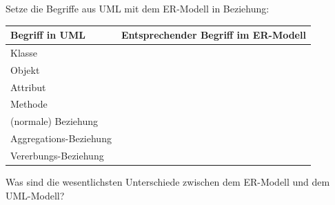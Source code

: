 \begin{compactenum}[a)]
\item Setze die Begriffe aus UML mit dem ER-Modell in Beziehung:

\vspace{2mm}

\bgroup
\def\arraystretch{1.2}
\begin{tabular}{|l|l|}\hline
\textbf{Begriff in UML} & \textbf{Entsprechender Begriff im ER-Modell\hspace{2cm}}
\\
\hline Klasse & \\ \hline
Objekt & \\ \hline
Attribut & \\ \hline
Methode & \\ \hline
(normale) Beziehung & \\ \hline
Aggregations-Beziehung & \\ \hline
Vererbungs-Beziehung & \\ \hline
\end{tabular}
\egroup

\vspace{2mm}

\item Was sind die wesentlichsten Unterschiede zwischen dem ER-Modell und dem
UML-Modell?
\end{compactenum}
